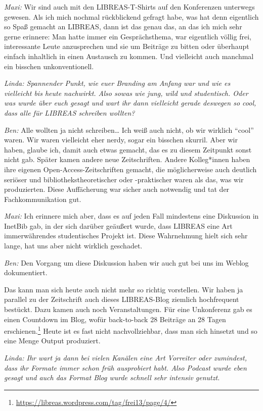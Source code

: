 \documentclass[a4paper,
fontsize=11pt,
oneside,
numbers=noperiodatend,
parskip=half-,
bibliography=totoc,
final
]{scrartcl}
\begin{document}
\emph{Maxi:} Wir sind auch mit den LIBREAS-T-Shirts auf den Konferenzen
unterwegs gewesen. Als ich mich nochmal rückblickend gefragt habe, was
hat denn eigentlich so Spaß gemacht an LIBREAS, dann ist das genau das,
an das ich mich sehr gerne erinnere: Man hatte immer ein Gesprächsthema,
war eigentlich völlig frei, interessante Leute anzusprechen und sie um
Beiträge zu bitten oder überhaupt einfach inhaltlich in einen Austausch
zu kommen. Und vielleicht auch manchmal ein bisschen unkonventionell.

\emph{Linda: Spannender Punkt, wie euer Branding am Anfang war und wie
es vielleicht bis heute nachwirkt. Also sowas wie jung, wild und
studentisch. Oder was wurde über euch gesagt und wart ihr dann
vielleicht gerade deswegen so cool, dass alle für LIBREAS schreiben
wollten?}

\emph{Ben:} Alle wollten ja nicht schreiben\ldots{} Ich weiß auch nicht,
ob wir wirklich \enquote{cool} waren. Wir waren vielleicht eher nerdy,
sogar ein bisschen skurril. Aber wir haben, glaube ich, damit auch etwas
gemacht, das es zu diesem Zeitpunkt sonst nicht gab. Später kamen andere
neue Zeitschriften. Andere Kolleg*innen haben ihre eigenen
Open-Access-Zeitschriften gemacht, die möglicherweise auch deutlich
seriöser und bibliothekstheoretischer oder -praktischer waren als das,
was wir produzierten. Diese Auffächerung war sicher auch notwendig und
tat der Fachkommunikation gut.

\emph{Maxi:} Ich erinnere mich aber, dass es auf jeden Fall mindestens
eine Diskussion in InetBib gab, in der sich darüber geäußert wurde, dass
LIBREAS eine Art immerwährendes studentisches Projekt ist. Diese
Wahrnehmung hielt sich sehr lange, hat uns aber nicht wirklich
geschadet.

\emph{Ben:} Den Vorgang um diese Diskussion haben wir auch gut bei uns
im Weblog dokumentiert.

Das kann man sich heute auch nicht mehr so richtig vorstellen. Wir haben
ja parallel zu der Zeitschrift auch dieses LIBREAS-Blog ziemlich
hochfrequent bestückt. Dazu kamen auch noch Veranstaltungen. Für eine
Unkonferenz gab es einen Countdown im Blog, wofür back-to-back 28
Beiträge an 28 Tagen erschienen.\footnote{\url{https://libreas.wordpress.com/tag/frei13/page/4/}}
Heute ist es fast nicht nachvollziehbar, dass man sich hinsetzt und so
eine Menge Output produziert.

\emph{Linda: Ihr wart ja dann bei vielen Kanälen eine Art Vorreiter oder
zumindest, dass ihr Formate immer schon früh ausprobiert habt. Also
Podcast wurde eben gesagt und auch das Format Blog wurde schnell sehr
intensiv genutzt.}
\end{document}
